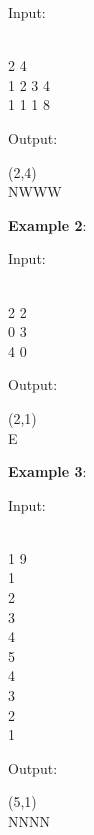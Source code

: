 \documentclass[a4paper,11pt]{article}
\begin{document}
\noindent 
Input:
 \begin{lstling} 
 \\
2 4 \\
1 2 3 4 \\
1 1 1 8 
\end{lstling} 

\vspace{2mm}

\noindent Output:\\
 \begin{lstling} 
(2,4)\\
NWWW
\end{lstling} 

\vspace{6mm}

\noindent \textbf{Example 2}:

\vspace{2mm}


\noindent 
Input:
 \begin{lstling} 
 \\
2 2 \\
0 3 \\
4 0
\end{lstling} 

\vspace{2mm}

\noindent Output:\\
 \begin{lstling} 
(2,1) \\
E
\end{lstling} 

\vspace{6mm}

\noindent \textbf{Example 3}:

\vspace{2mm}


\noindent 
Input:
 \begin{lstling} 
 \\
1 9 \\
1 \\
2 \\
3 \\
4 \\
5 \\
4 \\
3 \\
2 \\
1 
\end{lstling} 

\vspace{2mm}

\noindent Output:\\
 \begin{lstling} 
(5,1) \\
NNNN
\end{lstling} 
\end{document}
